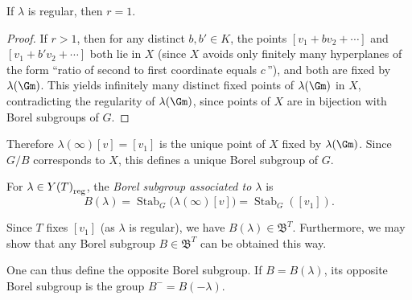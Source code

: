 \begin{lemma}
    If $\lambda$ is regular, then $r = 1$.
\end{lemma}
\begin{proof}
    If $r > 1$, then for any distinct $b, b' \in K$, the points $[v_1 + bv_2 + \cdots]$ and $[v_1 + b' v_2 + \cdots]$ both lie in $X$ (since $X$ avoids only finitely many hyperplanes of the form ``ratio of second to first coordinate equals $c$\,''), and both are fixed by $\lambda(\Gm)$. This yields infinitely many distinct fixed points of $\lambda(\Gm)$ in $X$, contradicting the regularity of $\lambda(\Gm)$, since points of $X$ are in bijection with Borel subgroups of $G$.
\end{proof}

Therefore $\lambda(\infty)[v] = [v_1]$ is the unique point of $X$ fixed by $\lambda(\Gm)$. Since $G/B$ corresponds to $X$, this defines a unique Borel subgroup of $G$.

\begin{defn}
    For $\lambda \in {Y(T)}_{\textnormal{reg}}$, the \emph{Borel subgroup associated to $\lambda$} is
    \[ B(\lambda) = \operatorname{Stab}_G\bigl(\lambda(\infty)[v]\bigr) = \operatorname{Stab}_G([v_1]). \]
\end{defn}
Since $T$ fixes $[v_1]$ (as $\lambda$ is regular), we have $B(\lambda) \in \mathfrak{B}^T$. Furthermore, we may show that any Borel subgroup $B \in \mathfrak{B}^T$ can be obtained this way. 

One can thus define the opposite Borel subgroup. If $B = B(\lambda)$, its opposite Borel subgroup is the group $B^{-} = B(-\lambda)$.

